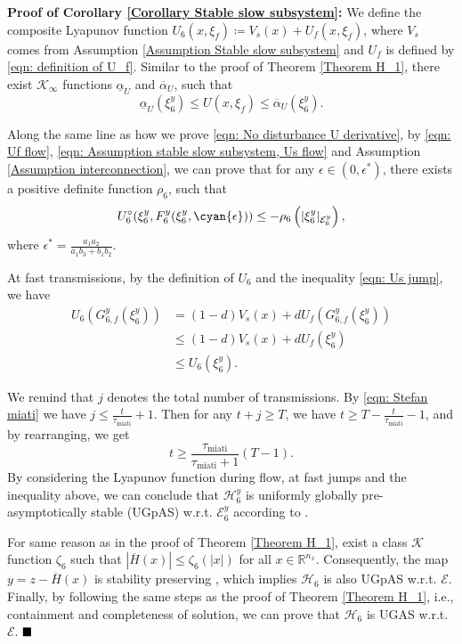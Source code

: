 \textbf{Proof of Corollary \ref{Corollary Stable slow subsystem}:} We define the composite Lyapunov function $U_6(x,\xi_f) \coloneqq V_s(x) + U_f(x,\xi_f)$, where $V_s$ comes from Assumption \ref{Assumption Stable slow subsystem} and $U_f$ is defined by \eqref{eqn: definition of U_f}. Similar to the proof of Theorem \ref{Theorem H_1}, there exist $\mathcal{K}_{\infty}$ functions $\underline{\alpha}_U$ and $\overline{\alpha}_{U}$, such that
\begin{equation*}
    \underline{\alpha}_U(\xi_6^y) \leq U(x,\xi_f) \leq  \overline{\alpha}_U(\xi_6^y).
\end{equation*}

Along the same line as how we prove \eqref{eqn: No disturbance U derivative}, by \eqref{eqn: Uf flow}, \eqref{eqn: Assumption stable slow subsystem, Us flow} and Assumption \ref{Assumption interconnection}, we can prove that for any $\epsilon \in (0,\epsilon^*)$, there exists a positive definite function $\rho_6$, such that
    \begin{equation*}
        U_6^\circ(\xi_6^y, F_6^y(\xi_6^y, \cyan{\epsilon})) \leq - \rho_6\left( |\xi_6^y|_{\mathcal{E}_6^y} \right),
    \end{equation*} 
where $\epsilon^*  = \tfrac{a_1 a_2}{a_1b_3 + b_1b_2}$.

At fast transmissions, by the definition of $U_6$ and the inequality \eqref{eqn: Us jump}, we have
\begin{equation*}
    \begin{aligned}
        U_6(G_{6,f}^y(\xi_6^y)) &= (1-d) V_s(x) + d U_f(G_{6,f}^y(\xi_6^y)) \\
        & \leq (1-d) V_s(x) + d U_f(\xi_6^y) \\
        & \leq U_6(\xi_6^y).
    \end{aligned}
\end{equation*}





We remind that $j$ denotes the total number of transmissions. By \eqref{eqn: Stefan miati} we have $j \leq \tfrac{t}{\tau_{\text{miati}}} + 1$. Then for any $t+j \geq T$, we have $t \geq T - \tfrac{t}{\tau_{\text{miati}}} - 1$, and by rearranging, we get
\begin{equation*}
    t \geq \frac{\tau_{\text{miati}}}{\tau_{\text{miati}} + 1} (T - 1).
\end{equation*}
By considering the Lyapunov function during flow, at fast jumps and the inequality above, we can conclude that $\mathcal{H}_6^y$ is uniformly globally pre-asymptotically stable (UGpAS) w.r.t. $\mathcal{E}_6^y$ according to \cite[Proposition 3.27]{gosate12}.

For same reason as in the proof of Theorem \ref{Theorem H_1}, exist a class $\mathcal{K}$ function $\zeta_6$ such that $|\overline{H}(x)| \leq \zeta_6(|x|)$ for all $x \in \mathbb{R}^{n_x}$. Consequently, the map $y = z - \overline{H}(x)$ is stability preserving \cite[pp. 450]{nonlinear_systems_Khalil}, which implies $\mathcal{H}_6$ is also UGpAS w.r.t. $\mathcal{E}$. Finally, by following the same steps as the proof of Theorem \ref{Theorem H_1}, i.e., containment \cite[Proposition 3.32]{gosate12} and completeness of solution, we can prove that $\mathcal{H}_6$ is UGAS w.r.t. $\mathcal{E}$.  $\hfill\blacksquare$